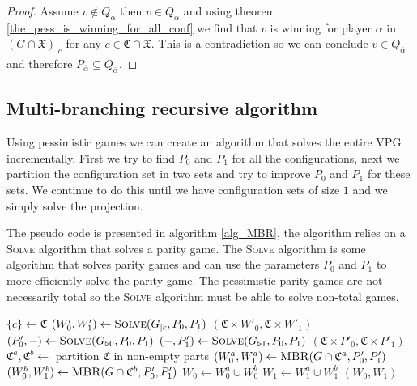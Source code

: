 \begin{lemma}
\begin{proof}
		Assume $v \notin Q_{\overline{\alpha}}$ then $v \in Q_{\alpha}$ and using theorem \ref{the_pess_is_winning_for_all_conf} we find that $v$ is winning for player $\alpha$ in $(G \cap \mathfrak{X})_{|c}$ for any $c \in \mathfrak{C} \cap \mathfrak{X}$. This is a contradiction so we can conclude $v \in Q_{\overline{\alpha}}$ and therefore $P_{\overline{\alpha}} \subseteq Q_{\overline{\alpha}}$.
	\end{proof}
\end{lemma}

\subsection{Multi-branching recursive algorithm}
Using pessimistic games we can create an algorithm that solves the entire VPG incrementally. First we try to find $P_0$ and $P_1$ for all the configurations, next we partition the configuration set in two sets and try to improve $P_0$ and $P_1$ for these sets. We continue to do this until we have configuration sets of size $1$ and we simply solve the projection.

The pseudo code is presented in algorithm \ref{alg_MBR}, the algorithm relies on a \textsc{Solve} algorithm that solves a parity game. The \textsc{Solve} algorithm is some algorithm that solves parity games and can use the parameters $P_0$ and $P_1$ to more efficiently solve the parity game. The pessimistic parity games are not necessarily total so the \textsc{Solve} algorithm must be able to solve non-total games.
\begin{algorithm}
	\caption{$\textsc{MBR}(G = (V,V_0,V_1, E, \Omega, \mathfrak{C}, \theta), P_0,P_1)$}\label{alg_MBR}
	\begin{algorithmic}[1]
			\State $\{c\} \gets \mathfrak{C}$
			\State $(W'_0,W'_1) \gets \textsc{Solve}(G_{|c}, P_0,P_1)$
			\State \Return $(\mathfrak{C} \times W'_0, \mathfrak{C} \times W'_1)$
		\EndIf
		\State $(P'_0,-) \gets \textsc{Solve}(G_{\triangleright0}, P_0, P_1)$
		\State $(-,P'_1) \gets \textsc{Solve}(G_{\triangleright1}, P_0, P_1)$
			\State \Return $(\mathfrak{C} \times P'_0, \mathfrak{C} \times P'_1)$
		\EndIf
		\State $\mathfrak{C}^a, \mathfrak{C}^b \gets $ partition $\mathfrak{C}$ in non-empty parts
		\State $(W_0^a, W_1^a) \gets \textsc{MBR}(G \cap \mathfrak{C}^a, P'_0,P'_1)$
		\State $(W_0^b, W_1^b) \gets \textsc{MBR}(G \cap \mathfrak{C}^b, P'_0,P'_1)$
		\State $W_0 \gets W_0^a \cup W_0^b$
		\State $W_1 \gets W_1^a \cup W_1^b$
		\State \Return $(W_0,W_1)$
	\end{algorithmic}
\end{algorithm}

